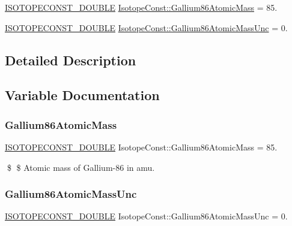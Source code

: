 \begin{DoxyCompactItemize}
\item 
\mbox{\hyperlink{group___isotope_const-_macros_ga8f45a7272ce02c0b4c65c44636ed719a}{I\+S\+O\+T\+O\+P\+E\+C\+O\+N\+S\+T\+\_\+\+D\+O\+U\+B\+LE}} \mbox{\hyperlink{group___isotope_const-_gallium-_ga86_ga86bcbdd5703c5f5096a859ee58e4e56e}{Isotope\+Const\+::\+Gallium86\+Atomic\+Mass}} = 85.
\item 
\mbox{\hyperlink{group___isotope_const-_macros_ga8f45a7272ce02c0b4c65c44636ed719a}{I\+S\+O\+T\+O\+P\+E\+C\+O\+N\+S\+T\+\_\+\+D\+O\+U\+B\+LE}} \mbox{\hyperlink{group___isotope_const-_gallium-_ga86_ga6859dac6b60cf01156eedf54d4af2bd4}{Isotope\+Const\+::\+Gallium86\+Atomic\+Mass\+Unc}} = 0.
\end{DoxyCompactItemize}


\subsection{Detailed Description}


\subsection{Variable Documentation}
\mbox{\label{group___isotope_const-_gallium-_ga86_ga86bcbdd5703c5f5096a859ee58e4e56e}} 
\subsubsection{\texorpdfstring{Gallium86\+Atomic\+Mass}{Gallium86AtomicMass}}
{\footnotesize\ttfamily \mbox{\hyperlink{group___isotope_const-_macros_ga8f45a7272ce02c0b4c65c44636ed719a}{I\+S\+O\+T\+O\+P\+E\+C\+O\+N\+S\+T\+\_\+\+D\+O\+U\+B\+LE}} Isotope\+Const\+::\+Gallium86\+Atomic\+Mass = 85.}

\$ \$ Atomic mass of Gallium-\/86 in amu. \mbox{\label{group___isotope_const-_gallium-_ga86_ga6859dac6b60cf01156eedf54d4af2bd4}} 
\subsubsection{\texorpdfstring{Gallium86\+Atomic\+Mass\+Unc}{Gallium86AtomicMassUnc}}
{\footnotesize\ttfamily \mbox{\hyperlink{group___isotope_const-_macros_ga8f45a7272ce02c0b4c65c44636ed719a}{I\+S\+O\+T\+O\+P\+E\+C\+O\+N\+S\+T\+\_\+\+D\+O\+U\+B\+LE}} Isotope\+Const\+::\+Gallium86\+Atomic\+Mass\+Unc = 0.}

